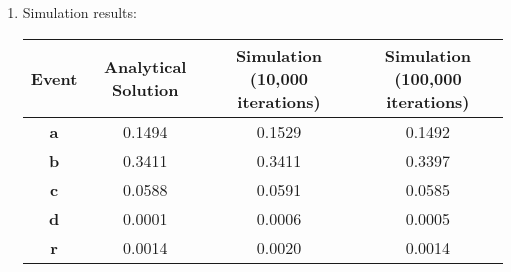{\begin{enumerate}
\begin{enumerate}
	Second draw: $ \frac{12}{51} $\\
	Third draw: $ \frac{11}{50} $\\
	Fourth draw: $ \frac{10}{49} $\\
	Fifth draw: $ \frac{9}{48} $\\
	
	Because these are independent events, we can multiply these probabilities together:
	\[ \frac{13}{52} \cdot \frac{12}{51} \cdot \frac{11}{50} \cdot \frac{10}{49} \approx 0.00018184\]
	
	So, the probability of drawing the first five cards as diamonds is approximately 0.00018184, or about 0.0182\%.
	
	\item \textbf{The first five cards form a full house}\\
	There are ${4 \choose 3} = 4$ different ways to choose 3 cards of the same type and ${4 \choose 2} = 6$ different ways to choose 2 cards of the same type. To get a full house, you need to first pick the type of the 3 of a kind, which is ${13 \choose 1} = 13$ different choices, and choose the type of the pair, which is ${12 \choose 1} = 12$ different choices. The order does not count, so there are ${13 \choose 1} \cdot {4 \choose 3} \cdot {12 \choose 1} \cdot {4 \choose 2}$ ways to have a full house.
	
	\[
	{13 \choose 1} \cdot {4 \choose 3} \cdot {12 \choose 1} \cdot {4 \choose 2} = 3744
	\]
	
	Note that there are ${52 \choose 5} = 2,598,960$ different combinations for the first 5 cards, so the probability of being dealt a full house is:
	
	\[
	\frac{3744}{2,598,960} \approx 0.14\%
	\]
	
	\end{enumerate}
	\item Simulation results:
	\begin{table}[H]
	    \centering %
	    \begin{tabular}{|c|c|c|c|} %
	        \hline
	        \textbf{Event} & \textbf{Analytical Solution} & \textbf{Simulation (10,000 iterations)} & \textbf{Simulation (100,000 iterations)}\\
	        \hline
	        \textbf{a} & 0.1494 & 0.1529 & 0.1492\\
	        \textbf{b} & 0.3411 & 0.3411 & 0.3397\\
	        \textbf{c} & 0.0588 & 0.0591 & 0.0585\\
	        \textbf{d} & 0.0001 & 0.0006 & 0.0005\\
	        \textbf{r} & 0.0014 & 0.0020 & 0.0014\\
	        \hline
	    \end{tabular}
	\end{table}
	\end{enumerate}
	}

